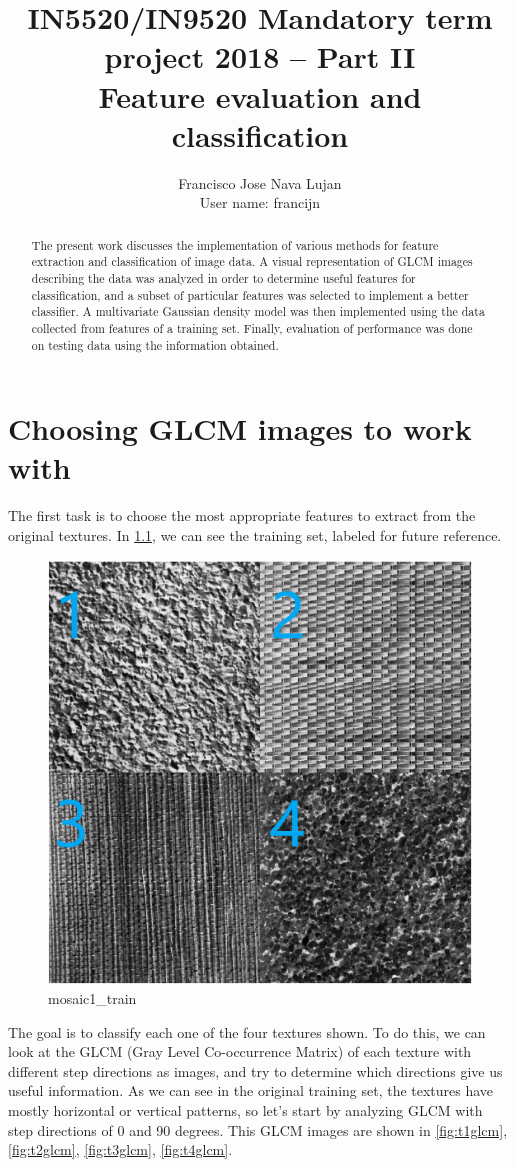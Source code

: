 \documentclass[a4paper, article, oneside, UKenglish]{memoir}
\title{IN5520/IN9520 Mandatory term project 2018 – Part II \\ Feature evaluation and classification}
\author{Francisco Jose Nava Lujan \\ User name: francijn}
\newcommand{\0}{\mathbf{0}}
\newcommand{\1}{\mathbf{1}}
\begin{document}
\maketitle


\begin{abstract}
\noindent
The present work discusses the implementation of various methods for feature extraction and classification of image data. A visual representation of GLCM images describing the data was analyzed in order to determine useful features for classification, and a subset of particular features was selected to implement a better classifier. A multivariate Gaussian density model was then implemented using the data collected from features of a training set. Finally, evaluation of performance was done on testing data using the information obtained.
\end{abstract}

\chapter{Choosing GLCM images to work with}
The first task is to choose the most appropriate features to extract from the original textures. In \cref{fig:m1t}, we can see the training set, labeled for future reference. 
   \begin{figure}[h]
     \begin{center}
       \includegraphics[width=0.5\linewidth]{./images/mosaic1_train.png}
     \end{center}
  \caption{mosaic1\_train}
  \label{fig:m1t}
\end{figure}

The goal is to classify each one of the four textures shown. To do this, we can look at the GLCM (Gray Level Co-occurrence Matrix) of each texture with different step directions as images, and try to determine which directions give us useful information. As we can see in the original training set, the textures have mostly horizontal or vertical patterns, so let's start by analyzing GLCM with step directions of 0 and 90 degrees. This GLCM images are shown in \cref{fig:t1glcm}, \cref{fig:t2glcm}, \cref{fig:t3glcm}, \cref{fig:t4glcm}.
\end{document}
